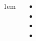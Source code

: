 \documentclass[	20pt, 
							a0paper, 
							landscape,
							margin=0mm, %
							innermargin=10mm,  		%
							blockverticalspace=4mm, %
							colspace=5mm, 
							subcolspace=0mm
							]{tikzposter}
\begin{document}
\begin{columns}

			{
					\setlength{\leftmargini}{3em}
					\setlength{\labelsep} {1em}
				\begin{LARGE}
					\begin{itemize}
					\item 
					\item 
					\item 
					\item 
					\end{itemize}
				\end{LARGE}
			} %






	\end{columns}
\end{document}
